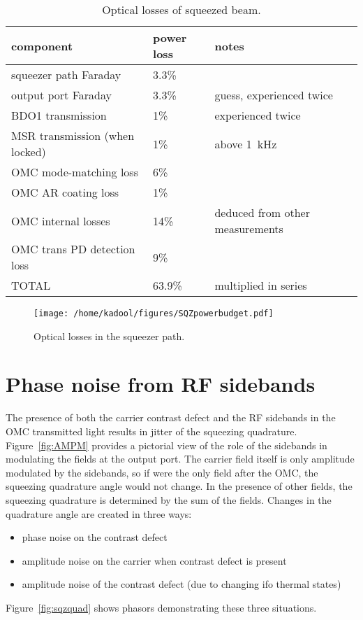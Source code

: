 \documentclass{ligodoc}
\begin{document}
\begin{table}
\centering
\caption{Optical losses of squeezed beam.}
\begin{tabular}{l l l} %
\hline
component & power loss & notes \\
\hline
squeezer path Faraday & 3.3\% & \\
output port Faraday & 3.3\% & guess, experienced twice \\
BDO1 transmission & 1\% & experienced twice \\
MSR transmission (when locked) & 1\% & above 1~kHz \\
OMC mode-matching loss & 6\% & \\
OMC AR coating loss & 1\% & \\
OMC internal losses & 14\% & deduced from other measurements \\ 
OMC trans PD detection loss & 9\% & \\
\hline
TOTAL & 63.9\% & multiplied in series \\
\hline
\end{tabular}
\label{tab:losses}
\end{table}


\begin{figure}
\begin{centering}
\texttt{[image: /home/kadool/figures/SQZpowerbudget.pdf]}
\caption{Optical losses in the squeezer path.}
\label{fig:powerbudget}
\end{centering}
\end{figure}



\section{Phase noise from RF sidebands}
The presence of both the carrier contrast defect and the RF sidebands
in the OMC transmitted light results in jitter of the squeezing
quadrature. Figure~\ref{fig:AMPM} provides a pictorial view of the
role of the sidebands in modulating the fields at the output port.
The carrier field itself is only amplitude modulated by the sidebands,
so if were the only field after the OMC, the squeezing quadrature
angle would not change. In the presence of other fields, the squeezing
quadrature is determined by the sum of the fields. Changes in the
quadrature angle are created in three ways:
\begin{itemize}
\item phase noise on the contrast defect
\item amplitude noise on the carrier when contrast defect is present
\item amplitude noise of the contrast defect (due to changing ifo
  thermal states)
\end{itemize}
Figure~\ref{fig:sqzquad} shows phasors demonstrating these three
situations.
\end{document}
